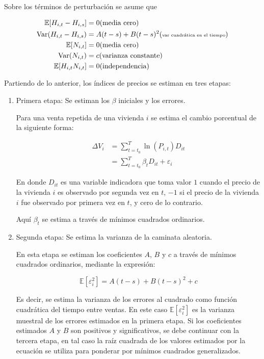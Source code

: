 \documentclass[conference]{IEEEtran}
\begin{document}
Sobre los términos de perturbación se asume que 

\begin{align*}
  \mathbb{E}[H_{i,t} - H_{i, s}] &= 0 (\text{media cero}) \\
  \text{Var}(H_{i,t} - H_{i, s}) &= A(t-s) + B(t-s)^2 (\tiny\text{var cuadrática en el tiempo})\\
  \mathbb{E}[N_{i, t}] &= 0 (\text{media cero})\\
  \text{Var}(N_{i, t}) &= c (\text{varianza constante})\\
  \mathbb{E}[H_{i,t}N_{i, t}] &= 0 (\text{independencia})
\end{align*}

Partiendo de lo anterior, los índices de precios se estiman en tres etapas:

\begin{enumerate}
  \item Primera etapa: Se estiman los $\beta$ iniciales y los errores.
  
  Para una venta repetida de una vivienda $i$ se estima el cambio porcentual de la siguiente forma:

  \begin{align*}
    \Delta V_i &= \sum_{t=t_0}^{T} \ln(P_{i,t}) D_{it}\\
    &= \sum_{t=t_0}^{T} \beta_t D_{it} + \varepsilon_{i}
  \end{align*}

  En donde $D_{it}$ es una variable indicadora que toma valor 
  $1$ cuando el precio de la vivienda $i$ es
  observado por segunda vez en $t$, $-1$ si el precio de la vivienda $i$ fue observado por primera
  vez en $t$, y cero de lo contrario. 

  Aquí $\beta_t$ se estima a través de mínimos cuadrados ordinarios.

  \item Segunda etapa: Se estima la varianza de la caminata aleatoria.
  
  En esta etapa se estiman los coeficientes $A$, $B$ y $c$ a través de mínimos cuadrados ordinarios,
  mediante la expresión:

  \[ \mathbb{E}[\varepsilon_i^2] = A(t-s) + B(t-s)^2 + c \]

  Es decir, se estima la varianza de los errores al cuadrado como función cuadrática del tiempo entre ventas.
  En este caso $\mathbb{E}[\varepsilon_i^2]$ es la varianza muestral de los errores estimados en la primera etapa.
  Si los coeficientes estimados $A$ y $B$ son positivos y significativos, se debe continuar con la tercera etapa, 
  en tal caso la raíz cuadrada de los valores estimados por la ecuación se utiliza para ponderar por mínimos cuadrados generalizados.


\end{enumerate}
\end{document}
